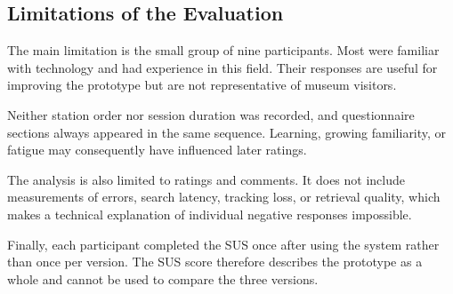 \subsection{Limitations of the Evaluation}

The main limitation is the small group of nine participants. Most were familiar with technology and had experience in this field. Their responses are useful for improving the prototype but are not representative of museum visitors.

Neither station order nor session duration was recorded, and questionnaire sections always appeared in the same sequence. Learning, growing familiarity, or fatigue may consequently have influenced later ratings.

The analysis is also limited to ratings and comments. It does not include measurements of errors, search latency, tracking loss, or retrieval quality, which makes a technical explanation of individual negative responses impossible.

Finally, each participant completed the SUS once after using the system rather than once per version. The SUS score therefore describes the prototype as a whole and cannot be used to compare the three versions.

\endgroup
